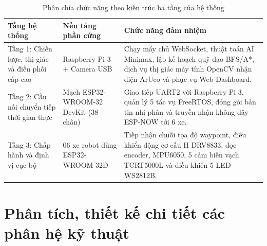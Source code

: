 \documentclass[12pt,a4paper]{report}
\newcommand{\tablefont}{\fontsize{12pt}{15pt}\selectfont}
\begin{document}
	\begin{table}[h!]
		\centering
		\tablefont
		\caption{Phân chia chức năng theo kiến trúc ba tầng của hệ thống}
		\label{tab:kien_truc_3_tang}
		\renewcommand{\arraystretch}{1.25}
		\begin{tabular}{|p{3.0cm}|p{3.8cm}|p{7.0cm}|}
			\hline
			\textbf{Tầng hệ thống} & \textbf{Nền tảng phần cứng} & \textbf{Chức năng đảm nhiệm} \\
			\hline
			Tầng 1: Chiến lược, thị giác và điều phối cấp cao & Raspberry Pi 3 + Camera USB & Chạy máy chủ WebSocket, thuật toán AI Minimax, lập kế hoạch quỹ đạo BFS/A*, dịch vụ thị giác máy tính OpenCV nhận diện ArUco và phục vụ Web Dashboard. \\
			\hline
			Tầng 2: Cầu nối chuyển tiếp thời gian thực & Mạch ESP32-WROOM-32 DevKit (38 chân) & Giao tiếp UART2 với Raspberry Pi 3, quản lý 5 tác vụ FreeRTOS, đóng gói bản tin nhị phân và truyền nhận không dây ESP-NOW tới 6 xe. \\
			\hline
			Tầng 3: Chấp hành và định vị cục bộ & 06 xe robot dùng ESP32-WROOM-32D & Tiếp nhận chuỗi tọa độ waypoint, điều khiển động cơ cầu H DRV8833, đọc encoder, MPU6050, 5 cảm biến vạch TCRT5000L và điều khiển 5 LED WS2812B. \\
			\hline
		\end{tabular}
	\end{table}
	
	\section{Phân tích, thiết kế chi tiết các phân hệ kỹ thuật}
	
\end{document}
